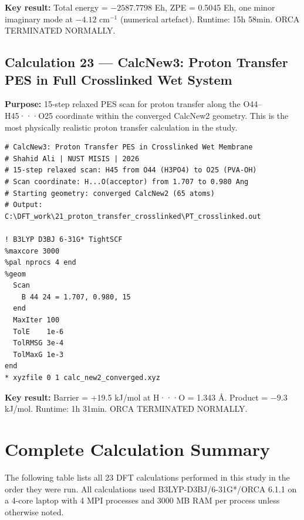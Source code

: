 \documentclass[12pt,a4paper]{report}
\begin{document}
\textbf{Key result:} Total energy = \(-2587.7798\) Eh, ZPE = 0.5045 Eh, one minor imaginary mode at \(-4.12\) cm\(^{-1}\) (numerical artefact). Runtime: 15h 58min. ORCA TERMINATED NORMALLY.

\section{Calculation 23 — CalcNew3: Proton Transfer PES in Full Crosslinked Wet System}

\textbf{Purpose:} 15-step relaxed PES scan for proton transfer along the O44–H45···O25 coordinate within the converged CalcNew2 geometry. This is the most physically realistic proton transfer calculation in the study.

\begin{verbatim}
# CalcNew3: Proton Transfer PES in Crosslinked Wet Membrane
# Shahid Ali | NUST MISIS | 2026
# 15-step relaxed scan: H45 from O44 (H3PO4) to O25 (PVA-OH)
# Scan coordinate: H...O(acceptor) from 1.707 to 0.980 Ang
# Starting geometry: converged CalcNew2 (65 atoms)
# Output: C:\DFT_work\21_proton_transfer_crosslinked\PT_crosslinked.out

! B3LYP D3BJ 6-31G* TightSCF
%maxcore 3000
%pal nprocs 4 end
%geom
  Scan
    B 44 24 = 1.707, 0.980, 15
  end
  MaxIter 100
  TolE    1e-6
  TolRMSG 3e-4
  TolMaxG 1e-3
end
* xyzfile 0 1 calc_new2_converged.xyz
\end{verbatim}

\textbf{Key result:} Barrier = +19.5 kJ/mol at H···O = 1.343 Å. Product = \(-9.3\) kJ/mol. Runtime: 1h 31min. ORCA TERMINATED NORMALLY.

\chapter{Complete Calculation Summary}

The following table lists all 23 DFT calculations performed in this study in the order they were run. All calculations used B3LYP-D3BJ/6-31G*/ORCA 6.1.1 on a 4-core laptop with 4 MPI processes and 3000 MB RAM per process unless otherwise noted.

\end{document}
